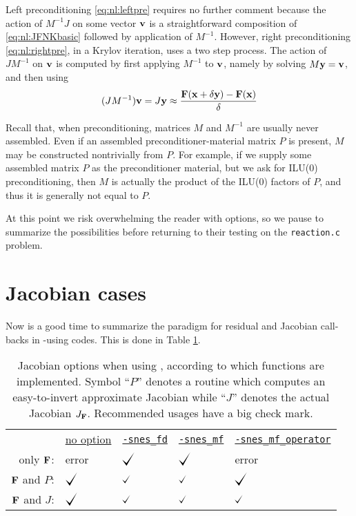Left preconditioning \eqref{eq:nl:leftpre} requires no further comment because the action of $M^{-1} J$ on some vector $\mathbf{v}$ is a straightforward composition of \eqref{eq:nl:JFNKbasic} followed by application of $M^{-1}$.  However, right preconditioning \eqref{eq:nl:rightpre}, in a Krylov iteration, uses a two step process.  The action of $J M^{-1}$ on $\mathbf{v}$ is computed by first applying $M^{-1}$ to $\mathbf{v}$, namely by solving $M \mathbf{y} = \mathbf{v}$, and then using
\begin{equation}
(J M^{-1}) \mathbf{v} = J \mathbf{y} \approx \frac{\mathbf{F}(\mathbf{x}+\delta \mathbf{y}) - \mathbf{F}(\mathbf{x})}{\delta} \label{eq:nl:JFNKwithrightpre}
\end{equation}

Recall that, when preconditioning, matrices $M$ and $M^{-1}$ are usually never assembled.  Even if an assembled preconditioner-material matrix $P$ is present, $M$ may be constructed nontrivially from $P$.  For example, if we supply some assembled matrix $P$ as the preconditioner material, but we ask for ILU($0$) preconditioning, then $M$ is actually the product of the ILU($0$) factors of $P$, and thus it is generally not equal to $P$.

At this point we risk overwhelming the reader with options, so we pause to summarize the possibilities before returning to their testing on the \texttt{reaction.c} problem.


\section{Jacobian cases} \label{sec:jacobiancases}

\def\checkmark{\tikz\fill[scale=0.4](0,.35) -- (.25,0) -- (.7,.8) -- (.25,.15) -- cycle;}
\def\bigcheckmark{\tikz\fill[scale=0.6](0,.35) -- (.25,0) -- (.7,.8) -- (.25,.15) -- cycle;}

Now is a good time to summarize the paradigm for residual and Jacobian call-backs in \pSNES-using codes.  This is done in Table \ref{tab:snesjacobianoptions}.

\begin{table}
\begin{tabular}{rllll}
 &\underline{no option}\hspace{0.0in} & \underline{\texttt{-snes\_fd}} & \underline{\texttt{-snes\_mf}} & \underline{\texttt{-snes\_mf\_operator}} \\
only $\mathbf{F}$:      & error           & $\bigcheckmark$ & $\bigcheckmark$ & error \\
$\mathbf{F}$ and $P$:   & $\bigcheckmark$ & $\checkmark$    & $\checkmark$    & $\bigcheckmark$ \\
$\mathbf{F}$ and $J$:   & $\bigcheckmark$ & $\checkmark$    & $\checkmark$    & $\checkmark$
\end{tabular}
\caption{Jacobian options when using \pSNES, according to which functions are implemented.  Symbol ``$P$'' denotes a routine which computes an easy-to-invert approximate Jacobian while ``$J$'' denotes the actual Jacobian $J_{\mathbf{F}}$.  Recommended usages have a big check mark.} \label{tab:snesjacobianoptions}
\end{table}

